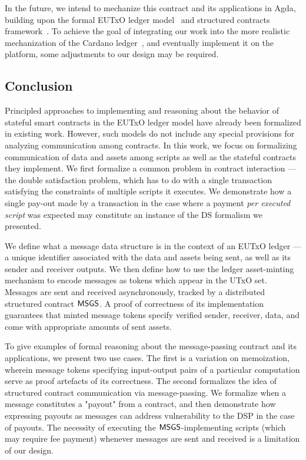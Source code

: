 In the future, we intend to mechanize this contract and its applications in Agda,
building upon the formal EUTxO ledger model~\cite{eutxo}
and structured contracts framework~\cite{structured}.
To achieve the goal of integrating our work into
the more realistic mechanization of the Cardano ledger~\cite{agdaspec},
and eventually implement it on the platform,
some adjustments to our design may be required.

\subsection{Conclusion}
\label{sec:conclusion}

Principled approaches to implementing and reasoning about the behavior of
stateful smart contracts in the EUTxO
ledger model have already been formalized in existing work.
However, such models do not include any special provisions for analyzing communication
among contracts. In this work, we focus on formalizing communication of data and assets among
scripts as well as the stateful contracts they implement.
We first formalize a common problem in contract interaction --- the double satisfaction problem,
which has to do with a single transaction satisfying the constraints of multiple scripts it executes.
We demonstrate how a single pay-out
made by a transaction in the case where a payment \emph{per executed script}
was expected may constitute an instance of the DS formalism we presented.

We define what a message data structure is in the context of an EUTxO ledger --- a
unique identifier associated with the data and assets being sent, as well as its sender
and receiver outputs. We then define how to use the ledger asset-minting mechanism
to encode messages as tokens which appear in the UTxO set. Messages are
sent and received asynchronously, tracked by a
distributed structured contract $\mathsf{MSGS}$. A proof of correctness of its implementation
guarantees that minted message tokens specify verified sender, receiver, data,
and come with appropriate amounts of sent assets.

To give examples of formal reasoning about the message-passing contract and its applications, we present
two use cases. The first is a variation on memoization,
wherein message tokens specifying input-output pairs of a particular computation
serve as proof artefacts of its correctness. The second formalizes
the idea of structured contract communication via message-passing.
We formalize when a message
constitutes a "payout" from a contract, and then demonstrate
how expressing payouts as messages can address vulnerability to the DSP
in the case of payouts. The necessity of executing the $\mathsf{MSGS}$-implementing
scripts (which may require fee payment) whenever messages are sent and received
is a limitation of our design.

